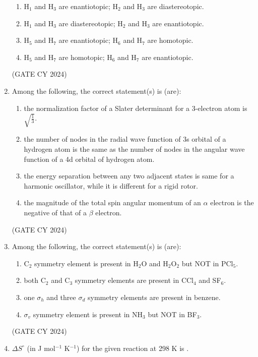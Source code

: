 \documentclass[12pt]{article}
\begin{document}
\begin{enumerate}
\begin{enumerate}
\item H$_1$ and H$_3$ are enantiotopic; H$_2$ and H$_3$ are diastereotopic.
\item H$_1$ and H$_3$ are diastereotopic; H$_2$ and H$_3$ are enantiotopic.
\item H$_5$ and H$_7$ are enantiotopic; H$_6$ and H$_7$ are homotopic.
\item H$_5$ and H$_7$ are homotopic; H$_6$ and H$_7$ are enantiotopic.
\end{enumerate}
\hfill (GATE CY 2024)

\item Among the following, the correct statement(s) is (are):

\begin{enumerate}
\item the normalization factor of a Slater determinant for a 3-electron atom is $\sqrt{\frac{1}{3}}$.
\item the number of nodes in the radial wave function of 3s orbital of a hydrogen atom is the same as the number of nodes in the angular wave function of a 4d orbital of hydrogen atom.
\item the energy separation between any two adjacent states is same for a harmonic oscillator, while it is different for a rigid rotor.
\item the magnitude of the total spin angular momentum of an $\alpha$ electron is the negative of that of a $\beta$ electron.
\end{enumerate}
\hfill (GATE CY 2024)

\item Among the following, the correct statement(s) is (are):

\begin{enumerate}
\item C$_2$ symmetry element is present in H$_2$O and H$_2$O$_2$ but NOT in PCl$_5$.
\item both C$_2$ and C$_3$ symmetry elements are present in CCl$_4$ and SF$_6$.
\item one $\sigma_h$ and three $\sigma_d$ symmetry elements are present in benzene.
\item $\sigma_v$ symmetry element is present in NH$_3$ but NOT in BF$_3$.
\end{enumerate}
\hfill (GATE CY 2024)

\item $\Delta S^\circ$ (in J mol$^{-1}$ K$^{-1}$) for the given reaction at 298 K is \underline{\hspace{2cm}}.


\end{enumerate}
\end{document}
